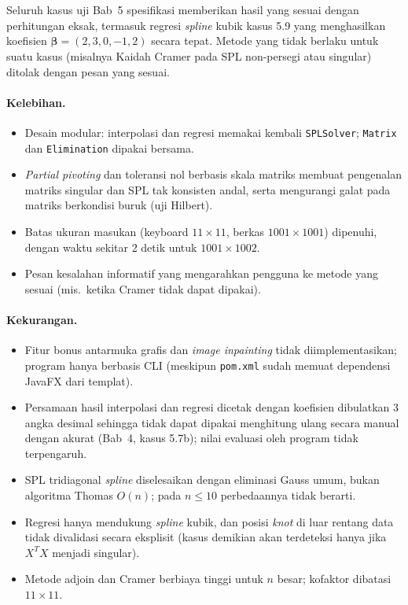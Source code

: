 \documentclass[12pt,a4paper]{article}
\begin{document}
Seluruh kasus uji Bab~5 spesifikasi memberikan hasil yang sesuai dengan perhitungan eksak, termasuk regresi \textit{spline} kubik kasus 5.9 yang menghasilkan koefisien $\hat{\boldsymbol\beta}=(2,3,0,-1,2)$ secara tepat. Metode yang tidak berlaku untuk suatu kasus (misalnya Kaidah Cramer pada SPL non-persegi atau singular) ditolak dengan pesan yang sesuai.

\paragraph{Kelebihan.}
\begin{itemize}
  \item Desain modular: interpolasi dan regresi memakai kembali \texttt{SPLSolver}; \texttt{Matrix} dan \texttt{Elimination} dipakai bersama.
  \item \textit{Partial pivoting} dan toleransi nol berbasis skala matriks membuat pengenalan matriks singular dan SPL tak konsisten andal, serta mengurangi galat pada matriks berkondisi buruk (uji Hilbert).
  \item Batas ukuran masukan (keyboard $11\times11$, berkas $1001\times1001$) dipenuhi, dengan waktu sekitar 2 detik untuk $1001\times1002$.
  \item Pesan kesalahan informatif yang mengarahkan pengguna ke metode yang sesuai (mis.\ ketika Cramer tidak dapat dipakai).
\end{itemize}

\paragraph{Kekurangan.}
\begin{itemize}
  \item Fitur bonus antarmuka grafis dan \textit{image inpainting} tidak diimplementasikan; program hanya berbasis CLI (meskipun \texttt{pom.xml} sudah memuat dependensi JavaFX dari templat).
  \item Persamaan hasil interpolasi dan regresi dicetak dengan koefisien dibulatkan 3 angka desimal sehingga tidak dapat dipakai menghitung ulang secara manual dengan akurat (Bab~4, kasus 5.7b); nilai evaluasi oleh program tidak terpengaruh.
  \item SPL tridiagonal \textit{spline} diselesaikan dengan eliminasi Gauss umum, bukan algoritma Thomas $O(n)$; pada $n\le10$ perbedaannya tidak berarti.
  \item Regresi hanya mendukung \textit{spline} kubik, dan posisi \textit{knot} di luar rentang data tidak divalidasi secara eksplisit (kasus demikian akan terdeteksi hanya jika $X^TX$ menjadi singular).
  \item Metode adjoin dan Cramer berbiaya tinggi untuk $n$ besar; kofaktor dibatasi $11\times11$.
\end{itemize}
\end{document}
